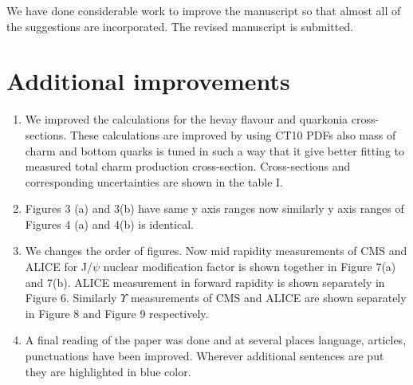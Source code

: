 \documentclass[aps,prc,preprint,superscriptaddress,showpacs,showkeys]{revtex4-1}
\begin{document}
{ \color{blue} We have done considerable work to improve the manuscript so that almost all of the 
suggestions are incorporated. The revised manuscript is submitted.} 

\section{Additional improvements}

\begin{enumerate}



\item { \color{blue} We improved the calculations for the hevay flavour and quarkonia cross-sections. These calculations
  are improved by using CT10 PDFs also mass of charm and bottom quarks is tuned in such a way that it give
  better fitting to measured total charm production cross-section. Cross-sections and corresponding uncertainties 
  are shown in the table I.  }   

\item { \color{blue} Figures 3 (a) and 3(b) have same y axis ranges now similarly y axis ranges of Figures 4 (a) and 4(b) is 
  identical. }
  
  
\item { \color{blue} We changes the order of figures. Now mid rapidity measurements of CMS and ALICE for J/$\psi$ nuclear modification
  factor is shown together in Figure 7(a) and 7(b). ALICE measurement in forward rapidity is shown separately in Figure 6.
  Similarly $\Upsilon$ measurements of CMS and ALICE are shown separately in Figure 8 and Figure 9 respectively.}        


\item { \color{blue} A final reading of the paper was done and at several places language, articles, punctuations
  have been improved. Wherever additional sentences are put they are highlighted in blue color.}


 
\end{enumerate}
\end{document}
